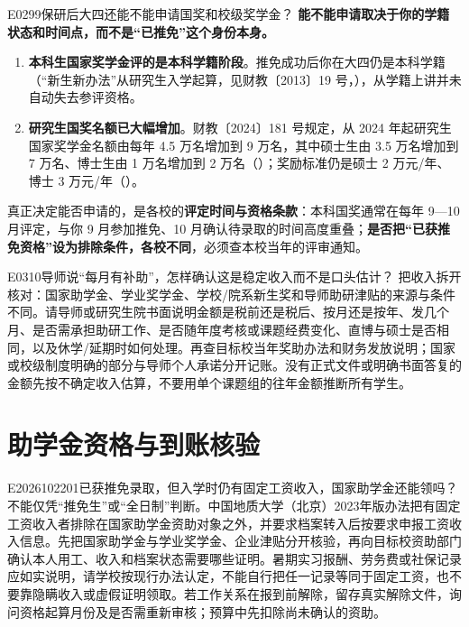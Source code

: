 \begin{qa}{E0299}{保研后大四还能不能申请国奖和校级奖学金？}
\textbf{能不能申请取决于你的学籍状态和时间点，而不是“已推免”这个身份本身。}

\begin{enumerate}
  \item \textbf{本科生国家奖学金评的是本科学籍阶段}。推免成功后你在大四仍是本科学籍（“新生新办法”从研究生入学起算，见财教〔2013〕19 号，），从学籍上讲并未自动失去参评资格。
  \item \textbf{研究生国奖名额已大幅增加}。财教〔2024〕181 号规定，从 2024 年起研究生国家奖学金名额由每年 4.5 万名增加到 9 万名，其中硕士生由 3.5 万名增加到 7 万名、博士生由 1 万名增加到 2 万名（）；奖励标准仍是硕士 2 万元/年、博士 3 万元/年（）。
\end{enumerate}

真正决定能否申请的，是各校的\textbf{评定时间与资格条款}：本科国奖通常在每年 9—10 月评定，与你 9 月参加推免、10 月确认待录取的时间高度重叠；\textbf{是否把“已获推免资格”设为排除条件，各校不同}，必须查本校当年的评审通知。
\end{qa}


\begin{qa}{E0310}{导师说“每月有补助”，怎样确认这是稳定收入而不是口头估计？}
把收入拆开核对：国家助学金、学业奖学金、学校/院系新生奖和导师助研津贴的来源与条件不同。请导师或研究生院书面说明金额是税前还是税后、按月还是按年、发几个月、是否需承担助研工作、是否随年度考核或课题经费变化、直博与硕士是否相同，以及休学/延期时如何处理。再查目标校当年奖助办法和财务发放说明；国家或校级制度明确的部分与导师个人承诺分开记账。没有正式文件或明确书面答复的金额先按不确定收入估算，不要用单个课题组的往年金额推断所有学生。
\end{qa}

\section{助学金资格与到账核验}
\begin{qa}{E2026102201}{已获推免录取，但入学时仍有固定工资收入，国家助学金还能领吗？}
不能仅凭“推免生”或“全日制”判断。中国地质大学（北京）2023年版办法把有固定工资收入者排除在国家助学金资助对象之外，并要求档案转入后按要求申报工资收入信息。先把国家助学金与学业奖学金、企业津贴分开核验，再向目标校资助部门确认本人用工、收入和档案状态需要哪些证明。暑期实习报酬、劳务费或社保记录应如实说明，请学校按现行办法认定，不能自行把任一记录等同于固定工资，也不要靠隐瞒收入或虚假证明领取。若工作关系在报到前解除，留存真实解除文件，询问资格起算月份及是否需重新审核；预算中先扣除尚未确认的资助。
\end{qa}

